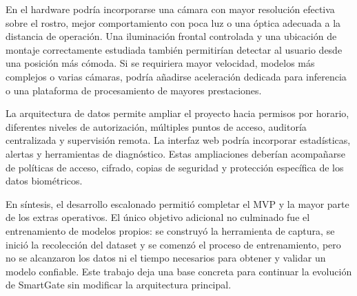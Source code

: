 En el hardware podría incorporarse una cámara con mayor resolución efectiva sobre el rostro, mejor comportamiento con poca luz o una óptica adecuada a la distancia de operación. Una iluminación frontal controlada y una ubicación de montaje correctamente estudiada también permitirían detectar al usuario desde una posición más cómoda. Si se requiriera mayor velocidad, modelos más complejos o varias cámaras, podría añadirse aceleración dedicada para inferencia o una plataforma de procesamiento de mayores prestaciones.

La arquitectura de datos permite ampliar el proyecto hacia permisos por horario, diferentes niveles de autorización, múltiples puntos de acceso, auditoría centralizada y supervisión remota. La interfaz web podría incorporar estadísticas, alertas y herramientas de diagnóstico. Estas ampliaciones deberían acompañarse de políticas de acceso, cifrado, copias de seguridad y protección específica de los datos biométricos.

En síntesis, el desarrollo escalonado permitió completar el MVP y la mayor parte de los extras operativos. El único objetivo adicional no culminado fue el entrenamiento de modelos propios: se construyó la herramienta de captura, se inició la recolección del dataset y se comenzó el proceso de entrenamiento, pero no se alcanzaron los datos ni el tiempo necesarios para obtener y validar un modelo confiable. Este trabajo deja una base concreta para continuar la evolución de SmartGate sin modificar la arquitectura principal.
